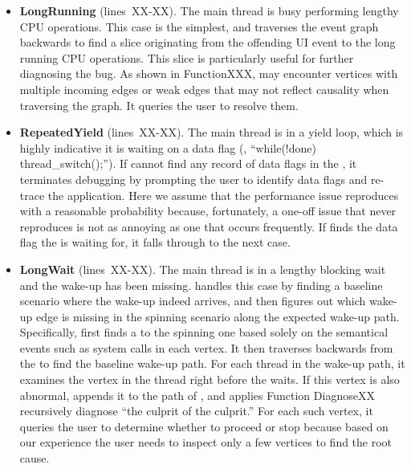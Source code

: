 \begin{itemize}

  \item \textbf{LongRunning} (lines~XX-XX). The main thread is busy
    performing lengthy CPU operations.  This case is the simplest, and
    \xxx traverses the event graph backwards to find a slice originating
    from the offending UI event to the long running CPU operations.  This
    slice is particularly useful for further diagnosing the bug.  As shown
    in FunctionXXX, \xxx may encounter vertices with multiple incoming edges
    or weak edges that may not reflect causality when traversing the
    graph.  It queries the user to resolve them.

  \item \textbf{RepeatedYield} (lines~XX-XX). The main thread is in a
    yield loop, which is highly indicative it is waiting on a data flag
    (\eg, ``while(!done) thread\_switch();'').  If \xxx cannot find any
    record of data flags in the \spinningnode, it terminates debugging by
    prompting the user to identify data flags and re-trace the
    application.  Here we assume that the performance issue reproduces
    with a reasonable probability because, fortunately, a one-off issue
    that never reproduces is not as annoying as one that occurs
    frequently.  If \xxx finds the data flag the \spinningnode is waiting
    for, it falls through to the next case.

  \item \textbf{LongWait} (lines~XX-XX). The main thread is in a lengthy
    blocking wait and the wake-up has been missing.  \xxx handles this
    case by finding a baseline scenario where the wake-up indeed arrives,
    and then figures out which wake-up edge is missing in the spinning
    scenario along the expected wake-up path.  Specifically, \xxx first
    finds a \similarnode to the spinning one based solely on the
    semantical events such as system calls in each vertex.  It then
    traverses backwards from the \similarnode to find the baseline wake-up
    path.  For each thread in the wake-up path, it examines the vertex in
    the thread right before the \spinningnode waits.  If this vertex is also
    abnormal, \xxx appends it to the path of \rootcausenodes, and applies
    Function DiagnoseXX recursively diagnose ``the culprit of the
    culprit.''  For each such vertex, it queries the user to determine
    whether to proceed or stop because based on our experience the user
    needs to inspect only a few vertices to find the root cause.

\end{itemize}


